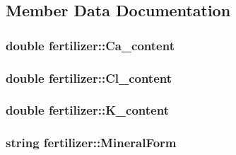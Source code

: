 \subsection{Member Data Documentation}
\hypertarget{classfertilizer_a600c30df6f51d426d0d62d4a1b0beab6}{
\subsubsection[{Ca\_\-content}]{\setlength{\rightskip}{0pt plus 5cm}double {\bf fertilizer::Ca\_\-content}}}
\label{classfertilizer_a600c30df6f51d426d0d62d4a1b0beab6}
\hypertarget{classfertilizer_abae61b73ba06463e0c9c854dc323a099}{
\subsubsection[{Cl\_\-content}]{\setlength{\rightskip}{0pt plus 5cm}double {\bf fertilizer::Cl\_\-content}}}
\label{classfertilizer_abae61b73ba06463e0c9c854dc323a099}
\hypertarget{classfertilizer_ae63c55759fdc6bf9bb65c8138179b3a6}{
\subsubsection[{K\_\-content}]{\setlength{\rightskip}{0pt plus 5cm}double {\bf fertilizer::K\_\-content}}}
\label{classfertilizer_ae63c55759fdc6bf9bb65c8138179b3a6}
\hypertarget{classfertilizer_a1984791c7e4363c98d2dd3655a192c60}{
\subsubsection[{MineralForm}]{\setlength{\rightskip}{0pt plus 5cm}string {\bf fertilizer::MineralForm}}}
\label{classfertilizer_a1984791c7e4363c98d2dd3655a192c60}
